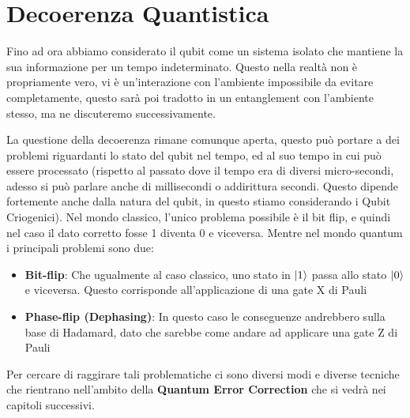  \section{Decoerenza Quantistica}
Fino ad ora abbiamo considerato il qubit come un sistema isolato che mantiene la sua informazione per un tempo indeterminato. Questo nella realtà non è propriamente vero, vi è un'interazione con l'ambiente impossibile da evitare completamente, questo sarà poi tradotto in un entanglement con l'ambiente stesso, ma ne discuteremo successivamente. 

La questione della decoerenza rimane comunque aperta, questo può portare a dei problemi riguardanti lo stato del qubit nel tempo, ed al suo tempo in cui può essere processato (rispetto al passato dove il tempo era di diversi micro-secondi, adesso si può parlare anche di millisecondi o addirittura secondi. Questo dipende fortemente anche dalla natura del qubit, in questo stiamo considerando i Qubit Criogenici). Nel mondo classico, l'unico problema possibile è il bit flip, e quindi nel caso il dato corretto fosse 1 diventa 0 e viceversa. Mentre nel mondo quantum i principali problemi sono due:
\begin{itemize}
    \item \textbf{Bit-flip}: Che ugualmente al caso classico, uno stato in \(\ket{1}\) passa allo stato \(\ket{0}\) e viceversa. Questo corrisponde all'applicazione di una gate X di Pauli
    
    \item \textbf{Phase-flip (Dephasing)}: In questo caso le conseguenze andrebbero sulla base di Hadamard, dato che sarebbe come andare ad applicare una gate Z di Pauli
\end{itemize}

Per cercare di raggirare tali problematiche ci sono diversi modi e diverse tecniche che rientrano nell'ambito della \textbf{Quantum Error Correction} che si vedrà nei capitoli successivi.

